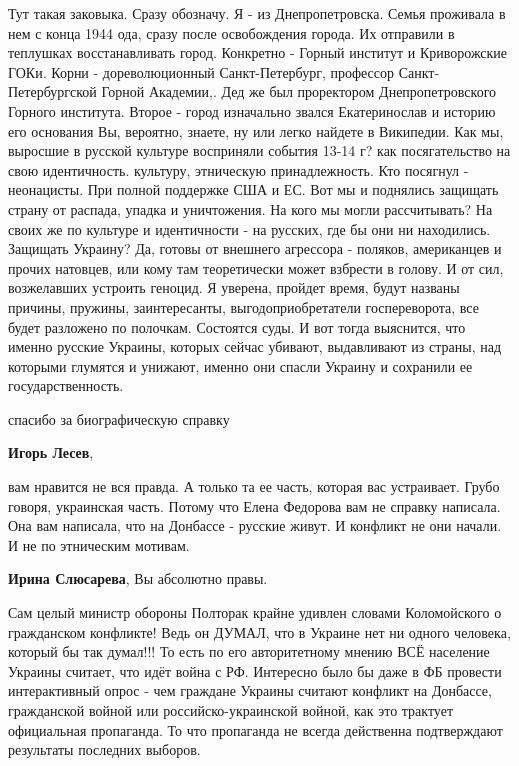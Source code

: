 \begin{itemize}
Тут такая заковыка. Сразу обозначу. Я - из Днепропетровска. Семья проживала в
нем с конца 1944 ода, сразу после освобождения города. Их отправили в теплушках
восстанавливать город. Конкретно - Горный институт и Криворожские ГОКи. Корни -
дореволюционный Санкт-Петербург, профессор Санкт-Петербургской Горной
Академии,. Дед же был проректором Днепропетровского Горного института. Второе -
город изначально звался Екатеринослав и историю его основания Вы, вероятно,
знаете, ну или легко найдете в Википедии. Как мы, выросшие в русской культуре
восприняли события 13-14 г? как посягательство на свою идентичность. культуру,
этническую принадлежность. Кто посягнул - неонацисты. При полной поддержке США
и ЕС. Вот мы и поднялись защищать страну от распада, упадка и уничтожения. На
кого мы могли рассчитывать? На своих же по культуре и идентичности - на
русских, где бы они ни находились. Защищать Украину? Да, готовы от внешнего
агрессора - поляков, американцев и прочих натовцев, или кому там теоретически
может взбрести в голову. И от сил, возжелавших устроить геноцид. Я уверена,
пройдет время, будут названы причины, пружины, заинтересанты,
выгодоприобретатели госпереворота, все будет разложено по полочкам. Состоятся
суды. И вот тогда выяснится, что именно русские Украины, которых сейчас
убивают, выдавливают из страны, над которыми глумятся и унижают, именно они
спасли Украину и сохранили ее государственность.

\begin{itemize} %
спасибо за биографическую справку

\textbf{Игорь Лесев}, 

вам нравится не вся правда. А только та ее часть, которая вас устраивает. Грубо
говоря, украинская часть. Потому что Елена Федорова вам не справку написала.
Она вам написала, что на Донбассе - русские живут. И конфликт не они начали. И
не по этническим мотивам.

\textbf{Ирина Слюсарева}, Вы абсолютно правы.
\end{itemize} %


Сам целый министр обороны Полторак крайне удивлен словами Коломойского о
гражданском конфликте! Ведь он ДУМАЛ, что в Украине нет ни одного человека,
который бы так думал!!! То есть по его авторитетному мнению ВСЁ население
Украины считает, что идёт война с РФ. Интересно было бы даже в ФБ провести
интерактивный опрос - чем граждане Украины считают конфликт на Донбассе,
гражданской войной или российско-украинской войной, как это трактует
официальная пропаганда. То что пропаганда не всегда действенна подтверждают
результаты последних выборов.


\end{itemize}
